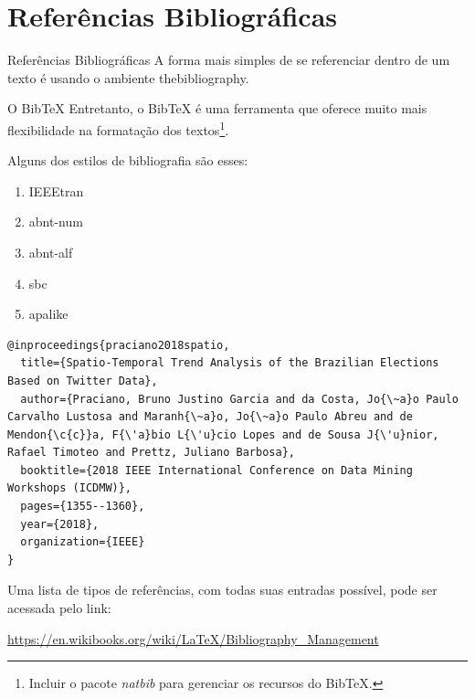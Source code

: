 \section{Referências Bibliográficas}

\begin{frame}{Referências Bibliográficas}
A forma mais simples de se referenciar dentro de um texto é usando o ambiente {\ttfamily thebibliography}.

\end{frame}

\begin{frame}{O Bib\TeX{}}
Entretanto, o Bib\TeX{} é uma ferramenta que oferece muito mais flexibilidade na formatação dos textos\footnote{Incluir o pacote \textit{natbib} para gerenciar os recursos do Bib\TeX{}.}.

Alguns dos estilos de bibliografia são esses:
\begin{enumerate}
	\item IEEEtran
	\item abnt-num
	\item abnt-alf
	\item sbc
	\item apalike
	\
\end{enumerate}
\end{frame}

\begin{frame}[fragile]
\begin{lstlisting}[linewidth=10cm]
@inproceedings{praciano2018spatio,
  title={Spatio-Temporal Trend Analysis of the Brazilian Elections Based on Twitter Data},
  author={Praciano, Bruno Justino Garcia and da Costa, Jo{\~a}o Paulo Carvalho Lustosa and Maranh{\~a}o, Jo{\~a}o Paulo Abreu and de Mendon{\c{c}}a, F{\'a}bio L{\'u}cio Lopes and de Sousa J{\'u}nior, Rafael Timoteo and Prettz, Juliano Barbosa},
  booktitle={2018 IEEE International Conference on Data Mining Workshops (ICDMW)},
  pages={1355--1360},
  year={2018},
  organization={IEEE}
}
\end{lstlisting}
\end{frame}

\begin{frame}
Uma lista de tipos de referências, com todas suas entradas possível, pode ser acessada pelo link:
\begin{center}
\url{https://en.wikibooks.org/wiki/LaTeX/Bibliography_Management}
\end{center}
\end{frame}


